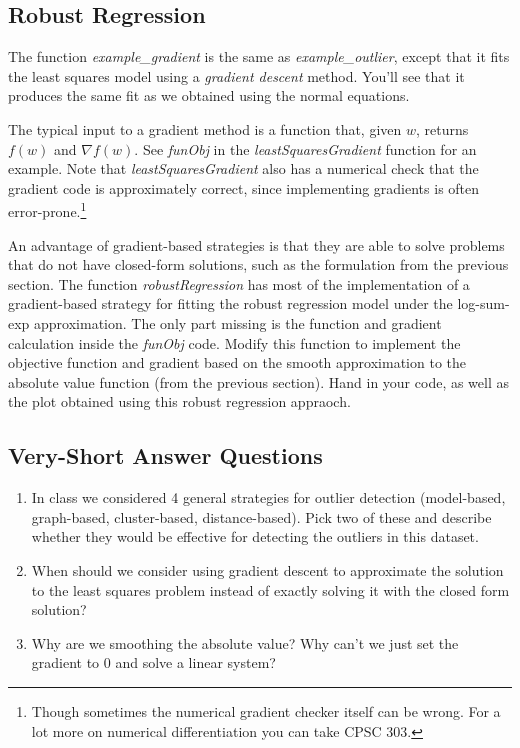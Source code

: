 \documentclass{article}
\def\blu#1{{\color{blu}#1}}
\def\enum#1{\begin{enumerate}#1\end{enumerate}}
\begin{document}
\subsection{Robust Regression}

The function \emph{example\_gradient} is the same as \emph{example\_outlier}, except that it fits the least squares model using a \emph{gradient descent} method. You'll see that it produces the same fit as we obtained using the normal equations.

The typical input to a gradient method is a function that, given $w$, returns $f(w)$ and $\nabla f(w)$. See \emph{funObj} in the \emph{leastSquaresGradient} function for an example. Note that \emph{leastSquaresGradient} also has a numerical check that the gradient code is approximately correct, since implementing gradients is often error-prone.\footnote{Though sometimes the numerical gradient checker itself can be wrong. For a lot more on numerical differentiation you can take CPSC 303.}

An advantage of gradient-based strategies is that they are able to solve problems that do not have closed-form solutions, such as the formulation from the previous section. The function \emph{robustRegression} has most of the implementation of a gradient-based strategy for fitting the robust regression model under the log-sum-exp approximation. The only part missing is the function and gradient calculation inside the \emph{funObj} code. \blu{Modify this function to implement the objective function and gradient based on the smooth approximation to the absolute value function (from the previous section). Hand in your code, as well as the plot obtained using this robust regression appraoch.}

\subsection{Very-Short Answer Questions}

\blu{
\enum{
\item In class we considered 4 general strategies for outlier detection (model-based, graph-based, cluster-based, distance-based). Pick two of these and describe whether they would be effective for detecting the outliers in this dataset.
\item When should we consider using gradient descent to approximate the solution to the least squares problem instead of exactly solving it with the closed form solution? 
\item Why are we smoothing the absolute value? Why can't we just set the gradient to 0 and solve a linear system?
}}
\end{document}
